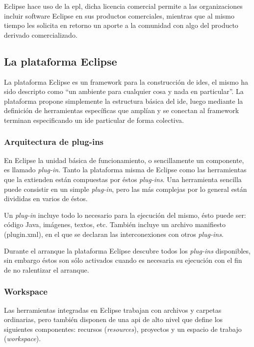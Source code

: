 \documentclass[a4paper,12pt,twoside,spanish,openright]{book}
\begin{document}
\textsf{Eclipse} hace uso de la \gls{epl}, dicha licencia comercial permite a las organizaciones incluir software \textsf{Eclipse} en sus productos comerciales, mientras que al mismo tiempo les solicita en retorno un aporte a la comunidad con algo del producto derivado comercializado.


\subsection{La plataforma Eclipse}
\label{subsec:PlatEclipse}

La plataforma \textsf{Eclipse} es un framework para la construcción de \glspl{ide}, el mismo ha sido descripto como ``un ambiente para cualquier cosa y nada en particular''. La plataforma propone simplemente la estructura básica del \gls{ide}, luego mediante la definición de herramientas específicas que amplían y se conectan al framework terminan especificando un \gls{ide} particular de forma colectiva.


\subsubsection{Arquitectura de plug-ins}

En \textsf{Eclipse} la unidad básica de funcionamiento, o sencillamente un componente, es llamado \textit{plug-in}. Tanto la plataforma misma de \textsf{Eclipse} como las herramientas que la extienden están compuestas por éstos \textit{plug-ins}. Una herramienta sencilla puede consistir en un simple \textit{plug-in}, pero las más complejas por lo general están divididas en varios de éstos.

Un \textit{plug-in} incluye todo lo necesario para la ejecución del mismo, ésto puede ser: código \textsf{Java}, imágenes, textos, etc. También incluye un archivo manifiesto (\textsf{plugin.xml}), en el que se declaran las interconexiones con otros \textit{plug-ins}.

Durante el arranque la plataforma \textsf{Eclipse} descubre todos los \textit{plug-ins} disponibles, sin embargo éstos son sólo activados cuando es necesaria su ejecución con el fin de no ralentizar el arranque.


\subsubsection{Workspace}

Las herramientas integradas en \textsf{Eclipse} trabajan con archivos y carpetas ordinarias, pero también disponen de una \gls{api} de alto nivel que define los siguientes componentes: recursos (\textit{resources}), proyectos y un espacio de trabajo (\textit{workspace}).
\end{document}
